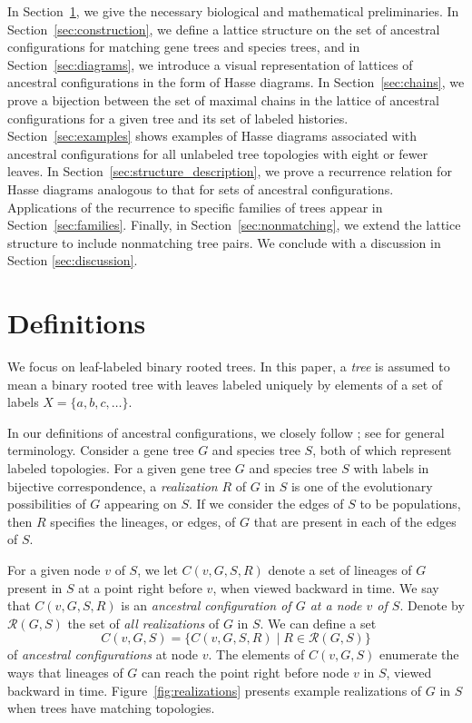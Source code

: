 \documentclass[10pt]{article}
\begin{document}
In Section~\ref{sec:def}, we give the necessary biological and mathematical preliminaries. In Section~\ref{sec:construction}, we define a lattice structure on the set of ancestral configurations for matching gene trees and species trees, and in Section~\ref{sec:diagrams}, we introduce a visual representation of lattices of ancestral configurations in the form of Hasse diagrams. In Section~\ref{sec:chains}, we prove a bijection between the set of maximal chains in the lattice of ancestral configurations for a given tree and its set of labeled histories. Section~\ref{sec:examples} shows examples of Hasse diagrams associated with ancestral configurations for all unlabeled tree topologies with eight or fewer leaves. In Section~\ref{sec:structure_description}, we prove a recurrence relation for Hasse diagrams analogous to that for sets of ancestral configurations. Applications of the recurrence to specific families of trees appear in Section~\ref{sec:families}. Finally, in Section~\ref{sec:nonmatching}, we extend the lattice structure to include nonmatching tree pairs. We conclude with a discussion in Section \ref{sec:discussion}.

\section{Definitions}\label{sec:def}

We focus on leaf-labeled binary rooted trees. In this paper, a \emph{tree} is assumed to mean a binary rooted tree with leaves labeled uniquely by elements of a set of labels $X = \{a, b, c, \ldots\}$. 

In our definitions of ancestral configurations, we closely follow \cite{disanto2017enumeration}; see \cite{steel2016phylogeny} for general terminology. Consider a gene tree $G$ and species tree $S$, both of which represent labeled topologies. For a given gene tree $G$ and species tree $S$ with labels in bijective correspondence, a \emph{realization} $R$ of $G$ in $S$ is one of the evolutionary possibilities of $G$ appearing on $S$. If we consider the edges of $S$ to be populations, then $R$ specifies the lineages, or edges, of $G$ that are present in each of the edges of $S$.

For a given node $v$ of $S$, we let $C(v, G, S, R)$ denote a set of lineages of $G$ present in $S$ at a point right before $v$, when viewed backward in time. We say that $C(v,G,S,R)$ is an \emph{ancestral configuration of $G$ at a node $v$ of $S$}. Denote by $\mathcal R(G,S)$ the set of \emph{all realizations} of $G$ in $S$. We can define a set 
\[
    C(v, G, S) = \{C(v, G, S, R) \mid R \in \mathcal R(G,S)\}
\]
of \emph{ancestral configurations} at node $v$. The elements of $C(v, G, S)$ enumerate the ways that lineages of $G$ can reach the point right before node $v$ in $S$, viewed backward in time. Figure~\ref{fig:realizations} presents example realizations of $G$ in $S$ when trees have matching topologies.
\end{document}
